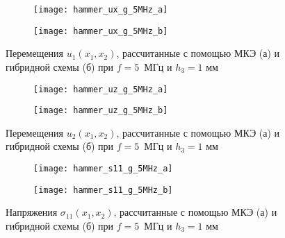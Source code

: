 \documentclass[press]{vestnik}
\begin{document}
\begin{figure}
	\centering
	\begin{subfigure}{.95\textwidth}
		\texttt{[image: hammer\_ux\_g\_5MHz\_a]}
		\caption{}\label{u1_xa}
	\end{subfigure}
		\begin{subfigure}{.95\textwidth}
		\texttt{[image: hammer\_ux\_g\_5MHz\_b]}
		\caption{}\label{u1_xb}
	\end{subfigure}
		\caption{Перемещения $u_{1}(x_{1},x_{2})$, рассчитанные с помощью МКЭ (а) и гибридной схемы (б) при $f=5$~МГц и $h_{3}=1$ мм}
		 \label{u1_x}
\end{figure}

\begin{figure}
	\centering
	\begin{subfigure}{.95\textwidth}
		\texttt{[image: hammer\_uz\_g\_5MHz\_a]}
		\caption{}\label{u2_xa}
	\end{subfigure}
		\begin{subfigure}{.95\textwidth}
		\texttt{[image: hammer\_uz\_g\_5MHz\_b]}
		\caption{}\label{u2_xb}
	\end{subfigure}
		\caption{Перемещения $u_{2}(x_{1},x_{2})$, рассчитанные с помощью МКЭ (а) и гибридной схемы (б) при $f=5$~МГц и $h_{3}=1$ мм}
		 \label{u2_x}

\end{figure}

\begin{figure}
	\centering
	\begin{subfigure}{.95\textwidth}
		\texttt{[image: hammer\_s11\_g\_5MHz\_a]}
		\caption{}\label{s11a}
	\end{subfigure}
		\begin{subfigure}{.95\textwidth}
		\texttt{[image: hammer\_s11\_g\_5MHz\_b]}
		\caption{}\label{s11b}
	\end{subfigure}
		\caption{Напряжения $\sigma_{11}(x_{1},x_{2})$, рассчитанные с помощью МКЭ (а) и гибридной схемы (б) при $f= 5$~МГц и $h_{3}=1$ мм}
		 \label{s11}
\end{figure}
\end{document}
